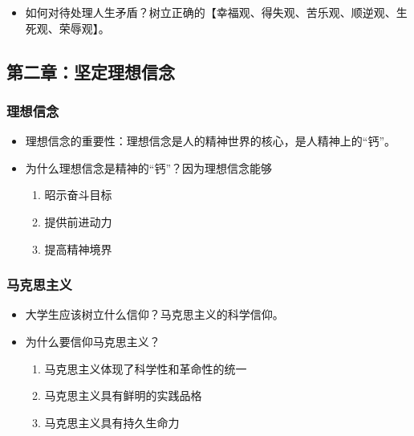 \documentclass[
]{article}
\begin{document}
\begin{itemize}
\item
  如何对待处理人生矛盾？树立正确的【幸福观、得失观、苦乐观、顺逆观、生死观、荣辱观】。
\end{itemize}

\hypertarget{header-n55}{%
\subsection{第二章：坚定理想信念}\label{header-n55}}

\hypertarget{header-n56}{%
\subsubsection{理想信念}\label{header-n56}}

\begin{itemize}
\item
  理想信念的重要性：理想信念是人的精神世界的核心，是人精神上的``钙''。
\item
  为什么理想信念是精神的``钙''？因为理想信念能够

  \begin{enumerate}
  \def\labelenumi{\arabic{enumi}.}
  \item
    昭示奋斗目标
  \item
    提供前进动力
  \item
    提高精神境界
  \end{enumerate}
\end{itemize}

\hypertarget{header-n69}{%
\subsubsection{马克思主义}\label{header-n69}}

\begin{itemize}
\item
  大学生应该树立什么信仰？马克思主义的科学信仰。
\item
  为什么要信仰马克思主义？

  \begin{enumerate}
  \def\labelenumi{\arabic{enumi}.}
  \item
    马克思主义体现了科学性和革命性的统一
  \item
    马克思主义具有鲜明的实践品格
  \item
    马克思主义具有持久生命力
  \end{enumerate}
\end{itemize}
\end{document}

